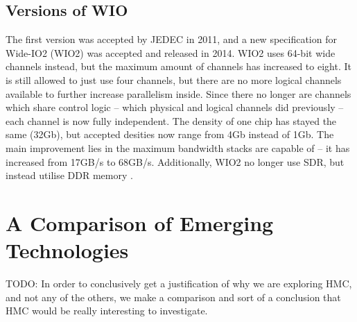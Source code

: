 \subsection{Versions of WIO}
The first version was accepted by JEDEC in 2011, and a new specification for Wide-IO2 (WIO2) was accepted and released in 2014. WIO2 uses 64-bit wide channels instead, but the maximum amount of channels has increased to eight. It is still allowed to just use four channels, but there are no more logical channels available to further increase parallelism inside. Since there no longer are channels which share control logic -- which physical and logical channels did previously -- each channel is now fully independent. The density of one chip has stayed the same (32Gb), but accepted desities now range from 4Gb instead of 1Gb. The main improvement lies in the maximum bandwidth stacks are capable of -- it has increased from 17GB/s to 68GB/s. Additionally, WIO2 no longer use SDR, but instead utilise DDR memory \cite{standard2014wide}. 

\section{A Comparison of Emerging Technologies}
TODO: In order to conclusively get a justification of why we are exploring HMC, and not any of the others, we make a comparison and sort of a conclusion that HMC would be really interesting to investigate.